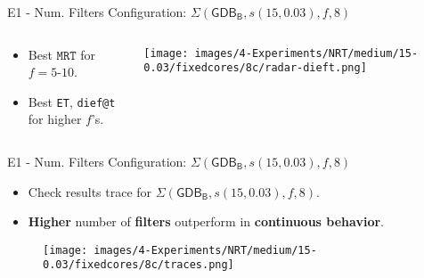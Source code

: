 \begin{frame}{E1 - Num. Filters Configuration: \small{$\Sigma(\mathsf{GDB_B}, s(15, 0.03), f, 8)$}}
\begin{columns} %
    \begin{column}{0.45\textwidth}
    \begin{itemize}
        \item Best $\texttt{MRT}$ for $f=5$-$10$.
        \vspace{1em}
        \item Best \texttt{ET}, \texttt{dief@t} for higher $f$'s.
    \end{itemize}
    \end{column}

    \begin{column}{0.7\textwidth}
        \centering
    \texttt{[image: images/4-Experiments/NRT/medium/15-0.03/fixedcores/8c/radar-dieft.png]}
    \end{column}
\end{columns}

\end{frame}

\begin{frame}{E1 - Num. Filters Configuration: \small{$\Sigma(\mathsf{GDB_B}, s(15, 0.03), f, 8)$}}
\begin{itemize}
    \item Check results trace for $\Sigma(\mathsf{GDB_B}, s(15, 0.03), f, 8)$.
    \item \textbf{Higher} number of \textbf{filters} outperform in \textbf{continuous behavior}.
\end{itemize}
\vspace{-0.5cm}
\begin{figure}
    \hspace{-0.70cm}
    \centering
    \texttt{[image: images/4-Experiments/NRT/medium/15-0.03/fixedcores/8c/traces.png]}
    \label{img:exps-medium-15D-8c-trace}
\end{figure}
\end{frame}

